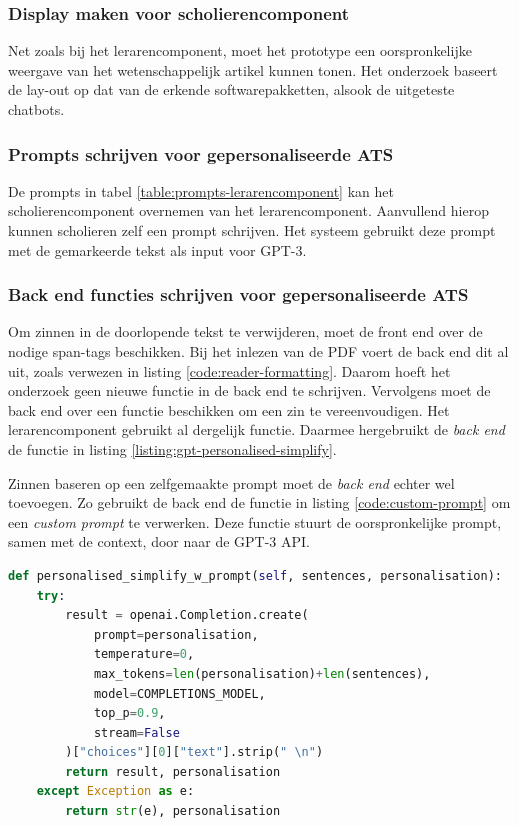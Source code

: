 \subsubsection{Display maken voor scholierencomponent}

Net zoals bij het lerarencomponent, moet het prototype een oorspronkelijke weergave van het wetenschappelijk artikel kunnen tonen. Het onderzoek baseert de lay-out op dat van de erkende softwarepakketten, alsook de uitgeteste chatbots. 

\subsubsection{Prompts schrijven voor gepersonaliseerde ATS}

De prompts in tabel \ref{table:prompts-lerarencomponent} kan het scholierencomponent overnemen van het lerarencomponent. Aanvullend hierop kunnen scholieren zelf een prompt schrijven. Het systeem gebruikt deze prompt met de gemarkeerde tekst als input voor GPT-3.

\subsubsection{Back end functies schrijven voor gepersonaliseerde ATS}

Om zinnen in de doorlopende tekst te verwijderen, moet de front end over de nodige span-tags beschikken. Bij het inlezen van de PDF voert de back end dit al uit, zoals verwezen in listing \ref{code:reader-formatting}. Daarom hoeft het onderzoek geen nieuwe functie in de back end te schrijven. Vervolgens moet de back end over een functie beschikken om een zin te vereenvoudigen. Het lerarencomponent gebruikt al dergelijk functie. Daarmee hergebruikt de \textit{back end} de functie in listing \ref{listing:gpt-personalised-simplify}. 

\medspace

Zinnen baseren op een zelfgemaakte prompt moet de \textit{back end} echter wel toevoegen. Zo gebruikt de back end de functie in listing \ref{code:custom-prompt} om een \textit{custom prompt} te verwerken. Deze functie stuurt de oorspronkelijke prompt, samen met de context, door naar de GPT-3 API.

\begin{lstlisting}[language=python, caption={Een API-call sturen naar GPT-3 met een custom prompt.}, label={code:custom-prompt}]
def personalised_simplify_w_prompt(self, sentences, personalisation):
	try:
		result = openai.Completion.create(
			prompt=personalisation,
			temperature=0,
			max_tokens=len(personalisation)+len(sentences),
			model=COMPLETIONS_MODEL,
			top_p=0.9,
			stream=False
		)["choices"][0]["text"].strip(" \n")
		return result, personalisation
	except Exception as e:
		return str(e), personalisation
\end{lstlisting}

